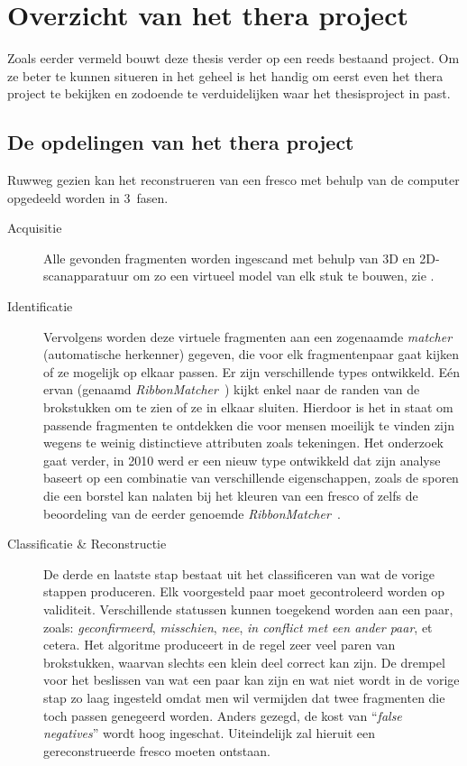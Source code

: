 \chapter{Overzicht van het thera project}
\label{hoofdstuk:overzicht}
Zoals eerder vermeld bouwt deze thesis verder op een reeds bestaand project. Om ze beter te kunnen situeren in het geheel is het handig om eerst even het thera project te bekijken en zodoende te verduidelijken waar het thesisproject in past.

\section{De opdelingen van het thera project}
Ruwweg gezien kan het reconstrueren van een fresco met behulp van de computer opgedeeld worden in 3~fasen.

\begin{description}
	\item[Acquisitie] Alle gevonden fragmenten worden ingescand met behulp van 3D en 2D-scanapparatuur om zo een virtueel model van elk stuk te bouwen, zie \cite{Brown2008}.  
	\item[Identificatie] Vervolgens worden deze virtuele fragmenten aan een zogenaamde \emph{matcher} (automatische herkenner) gegeven, die voor elk fragmentenpaar gaat kijken of ze mogelijk op elkaar passen. Er zijn verschillende types ontwikkeld. E\'en ervan (genaamd \emph{RibbonMatcher}~\cite{Brown2008}) kijkt enkel naar de randen van de brokstukken om te zien of ze in elkaar sluiten. Hierdoor is het in staat om passende fragmenten te ontdekken die voor mensen moeilijk te vinden zijn wegens te weinig distinctieve attributen zoals tekeningen. Het onderzoek gaat verder, in 2010 werd er een nieuw type ontwikkeld dat zijn analyse baseert op een combinatie van verschillende eigenschappen, zoals de sporen die een borstel kan nalaten bij het kleuren van een fresco of zelfs de beoordeling van de eerder genoemde \emph{RibbonMatcher}~\cite{TolerFranklin2010}.
	\item[Classificatie \& Reconstructie] De derde en laatste stap bestaat uit het classificeren van wat de vorige stappen produceren. Elk voorgesteld paar moet gecontroleerd worden op validiteit. Verschillende statussen kunnen toegekend worden aan een paar, zoals: \emph{geconfirmeerd}, \emph{misschien}, \emph{nee}, \emph{in conflict met een ander paar}, et cetera. Het algoritme produceert in de regel zeer veel paren van brokstukken, waarvan slechts een klein deel correct kan zijn. De drempel voor het beslissen van wat een paar kan zijn en wat niet wordt in de vorige stap zo laag ingesteld omdat men wil vermijden dat twee fragmenten die toch passen genegeerd worden. Anders gezegd, de kost van ``\emph{false negatives}'' wordt hoog ingeschat. Uiteindelijk zal hieruit een gereconstrueerde fresco moeten ontstaan.
\end{description}

